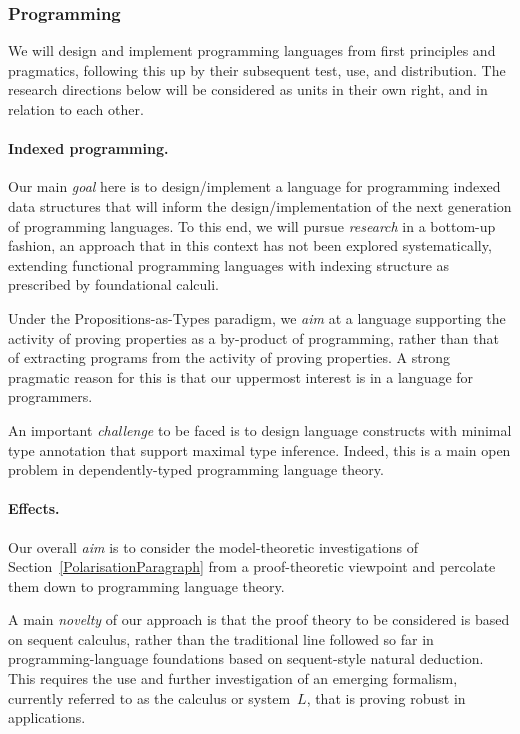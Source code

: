 \documentclass[11pt,twocolumn]{article}
\newcommand{\hl}{\emph}
\newcommand{\SysL}{$L$}%
\begin{document}
\subsubsection{Programming}
\label{Programming}

We will design and implement programming languages from first principles and
pragmatics, following this up by their subsequent test, use, and distribution.
The research directions below will be considered as units in their own right,
and in relation to each other.

\paragraph{Indexed programming.}
\label{IndexedProgrammingParagraph}

Our main \hl{goal} here is to design/implement a language for programming
indexed data structures that will inform the design/implementation of the next
generation of programming languages.  To this end, we will pursue
\hl{research} in a bottom-up fashion, an approach that in this context has not
been explored systematically, extending functional programming languages with
indexing structure as prescribed by foundational calculi.

Under the Propositions-as-Types paradigm, we \hl{aim} at a language
supporting the activity of proving properties as a by-product of programming,
rather than that of extracting programs from the activity of proving
properties.  A strong pragmatic reason for this is that our uppermost interest
is in a language for programmers. 

An important \hl{challenge} to be faced is to design language constructs
with minimal type annotation that support maximal type inference.  Indeed,
this is a main open problem in dependently-typed programming language theory.

\paragraph{Effects.}
\label{ProgrammingEffectsParagraph}

Our overall \hl{aim} is to consider the model-theoretic investigations of
Section~\ref{PolarisationParagraph} from a proof-theoretic viewpoint and
percolate them down to programming language theory.

A main \hl{novelty} of our approach is that the proof theory to be
considered is based on sequent calculus, rather than the traditional line
followed so far in programming-language foundations based on sequent-style
natural deduction.  This requires the use and further investigation of an
emerging formalism, currently referred to as the calculus or system~\SysL,
that is proving robust in applications.
\end{document}
